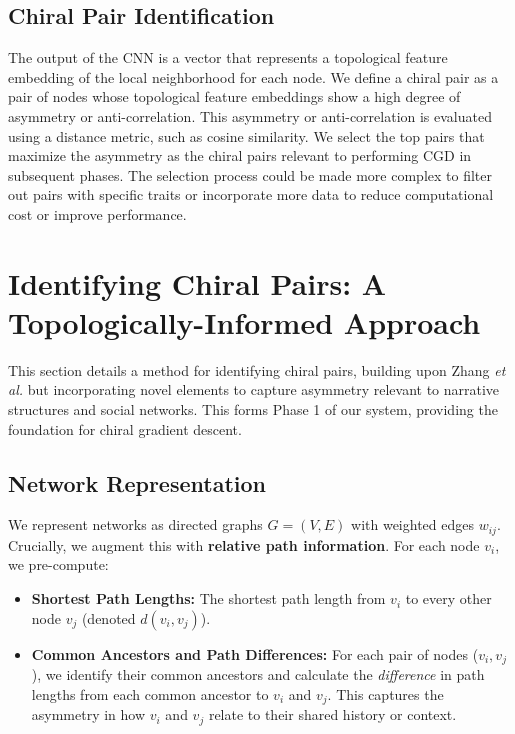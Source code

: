 \documentclass[12pt, a4paper]{article}
\begin{document}
\subsection{Chiral Pair Identification}

The output of the CNN is a vector that represents a topological feature embedding of the local neighborhood for each node.  We define a chiral pair as a pair of nodes whose topological feature embeddings show a high degree of asymmetry or anti-correlation. This asymmetry or anti-correlation is evaluated using a distance metric, such as cosine similarity. We select the top pairs that maximize the asymmetry as the chiral pairs relevant to performing CGD in subsequent phases.  The selection process could be made more complex to filter out pairs with specific traits or incorporate more data to reduce computational cost or improve performance.

\section{Identifying Chiral Pairs: A Topologically-Informed Approach}

This section details a method for identifying chiral pairs, building upon Zhang \textit{et al.} \cite{zhang2018machine} but incorporating novel elements to capture asymmetry relevant to narrative structures and social networks. This forms Phase 1 of our system, providing the foundation for chiral gradient descent.

\subsection{Network Representation}

We represent networks as directed graphs $G = (V, E)$ with weighted edges $w_{ij}$. Crucially, we augment this with \textbf{relative path information}. For each node $v_i$, we pre-compute:

\begin{itemize}
    \item \textbf{Shortest Path Lengths:} The shortest path length from $v_i$ to every other node $v_j$ (denoted $d(v_i, v_j)$).
    \item \textbf{Common Ancestors and Path Differences:} For each pair of nodes ($v_i, v_j$), we identify their common ancestors and calculate the \textit{difference} in path lengths from each common ancestor to $v_i$ and $v_j$. This captures the asymmetry in how $v_i$ and $v_j$ relate to their shared history or context.
\end{itemize}
\end{document}
